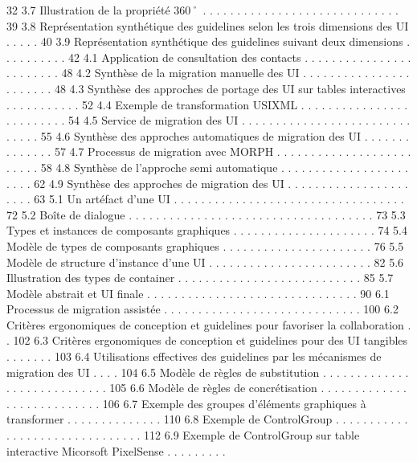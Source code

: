 \documentclass{article}
\begin{document}
32
3.7
Illustration de la propriété 360˚ . . . . . . . . . . . . . . . . . . . . . . . . . . . . .
39
3.8
Représentation synthétique des guidelines selon les trois dimensions des UI . . . . .
40
3.9
Représentation synthétique des guidelines suivant deux dimensions . . . . . . . . . .
42
4.1
Application de consultation des contacts . . . . . . . . . . . . . . . . . . . . . . . .
48
4.2
Synthèse de la migration manuelle des UI . . . . . . . . . . . . . . . . . . . . . . .
48
4.3
Synthèse des approches de portage des UI sur tables interactives . . . . . . . . . . .
52
4.4
Exemple de transformation USIXML
. . . . . . . . . . . . . . . . . . . . . . . . .
54
4.5
Service de migration des UI
. . . . . . . . . . . . . . . . . . . . . . . . . . . . . .
55
4.6
Synthèse des approches automatiques de migration des UI
. . . . . . . . . . . . . .
57
4.7
Processus de migration avec MORPH . . . . . . . . . . . . . . . . . . . . . . . . .
58
4.8
Synthèse de l’approche semi automatique
. . . . . . . . . . . . . . . . . . . . . . .
62
4.9
Synthèse des approches de migration des UI . . . . . . . . . . . . . . . . . . . . . .
63
5.1
Un artéfact d’une UI
. . . . . . . . . . . . . . . . . . . . . . . . . . . . . . . . . .
72
5.2
Boîte de dialogue . . . . . . . . . . . . . . . . . . . . . . . . . . . . . . . . . . . .
73
5.3
Types et instances de composants graphiques
. . . . . . . . . . . . . . . . . . . . .
74
5.4
Modèle de types de composants graphiques
. . . . . . . . . . . . . . . . . . . . . .
76
5.5
Modèle de structure d’instance d’une UI . . . . . . . . . . . . . . . . . . . . . . . .
82
5.6
Illustration des types de container
. . . . . . . . . . . . . . . . . . . . . . . . . . .
85
5.7
Modèle abstrait et UI ﬁnale . . . . . . . . . . . . . . . . . . . . . . . . . . . . . . .
90
6.1
Processus de migration assistée . . . . . . . . . . . . . . . . . . . . . . . . . . . . .
100
6.2
Critères ergonomiques de conception et guidelines pour favoriser la collaboration . .
102
6.3
Critères ergonomiques de conception et guidelines pour des UI tangibles . . . . . . .
103
6.4
Utilisations effectives des guidelines par les mécanismes de migration des UI
. . . .
104
6.5
Modèle de règles de substitution . . . . . . . . . . . . . . . . . . . . . . . . . . . .
105
6.6
Modèle de règles de concrétisation . . . . . . . . . . . . . . . . . . . . . . . . . . .
106
6.7
Exemple des groupes d’éléments graphiques à transformer
. . . . . . . . . . . . . .
110
6.8
Exemple de ControlGroup
. . . . . . . . . . . . . . . . . . . . . . . . . . . . . . .
112
6.9
Exemple de ControlGroup sur table interactive Micorsoft PixelSense . . . . . . . . .
\end{document}

